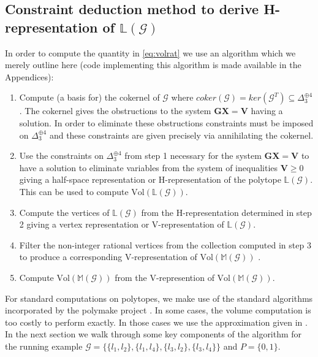 \subsection{Constraint deduction method to derive H-representation of $\mathbb{L}(\mathcal{G})$}
In order to compute the quantity in \ref{eq:volrat} we use an algorithm which we merely outline here (code implementing this algorithm is made available in the Appendices):
\begin{enumerate}
\item Compute (a basis for) the cokernel of $\mathcal{G}$ where $coker(\mathcal{G}) = ker(\mathcal{G}^T) \subseteq \Delta_3^{\oplus 4}$. The cokernel gives the obstructions to the system $\mathbf{G}\mathbf{X}=\mathbf{V}$ having a solution. In order to eliminate these obstructions constraints must be imposed on $\Delta_3^{\oplus 4}$ and these constraints are given precisely via annihilating the cokernel.
\item Use the constraints on $\Delta_3^{\oplus 4}$ from step 1 necessary for the system $\mathbf{G}\mathbf{X}=\mathbf{V}$ to have a solution to eliminate variables from the system of inequalities $\mathbf{V} \geq 0$ giving a half-space representation or H-representation of the polytope $\mathbb{L}(\mathcal{G})$. This can be used to compute $\text{Vol}(\mathbb{L}(\mathcal{G}))$.
\item Compute the vertices of $\mathbb{L}(\mathcal{G})$ from the H-representation determined in step 2 giving a vertex representation or V-representation of $\mathbb{L}(\mathcal{G})$.
\item Filter the non-integer rational vertices from the collection computed in step 3 to produce a corresponding V-representation of $\text{Vol}(\mathbb{M}(\mathcal{G}))$ \cite{Wainwright2007}.
\item Compute $\text{Vol}(\mathbb{M}(\mathcal{G}))$ from the V-represention of $\text{Vol}(\mathbb{M}(\mathcal{G}))$.
\end{enumerate}
For standard computations on polytopes, we make use of the standard algorithms incorporated by the polymake project \cite{Gawrilow2000}. In some cases, the volume computation is too costly to perform exactly. In those cases we use the approximation given in \cite{Cousins}. In the next section we walk through some key components of the algorithm for the running example $\mathcal{G} = \{\{l_1,l_2 \},\{l_1,l_4 \},\{l_3,l_2\},\{l_3,l_4\} \}$ and $P=\{0,1\}$.

